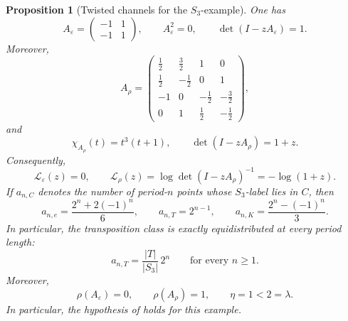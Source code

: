 \documentclass[11pt,a4paper]{amsart}
\theoremstyle{plain}
\newtheorem{proposition}[theorem]{Proposition}
\theoremstyle{definition}
\theoremstyle{remark}
\begin{document}
\begin{proposition}[Twisted channels for the \(S_3\)-example]
  \label{prop:s3-example-channels}
  One has
  \begin{equation}\label{eq:s3-example-aeps}
    A_\varepsilon=
    \begin{pmatrix}
      -1 & 1 \\
      -1 & 1
    \end{pmatrix},
    \qquad
    A_\varepsilon^2=0,
    \qquad
    \det(I-zA_\varepsilon)=1.
  \end{equation}
  Moreover,
  \begin{equation}\label{eq:s3-example-arho}
    A_\rho=
    \begin{pmatrix}
      \frac12 & \frac32 & 1 & 0 \\
      \frac12 & -\frac12 & 0 & 1 \\
      -1 & 0 & -\frac12 & -\frac32 \\
      0 & 1 & \frac12 & -\frac12
    \end{pmatrix},
  \end{equation}
  and
  \begin{equation}\label{eq:s3-example-arho-charpoly}
    \chi_{A_\rho}(t)=t^3(t+1),
    \qquad
    \det(I-zA_\rho)=1+z.
  \end{equation}
  Consequently,
  \begin{equation}\label{eq:s3-example-logarithms}
    \mathcal L_\varepsilon(z)=0,
    \qquad
    \mathcal L_\rho(z)=\log\det(I-zA_\rho)^{-1}=-\log(1+z).
  \end{equation}
  If \(a_{n,C}\) denotes the number of period-\(n\) points whose
  \(S_3\)-label lies in \(C\), then
  \begin{equation}\label{eq:s3-example-periodic-classes}
    a_{n,e}=\frac{2^n+2(-1)^n}{6},
    \qquad
    a_{n,T}=2^{n-1},
    \qquad
    a_{n,K}=\frac{2^n-(-1)^n}{3}.
  \end{equation}
  In particular, the transposition class is exactly equidistributed at
  every period length:
  \begin{equation}\label{eq:s3-example-periodic-equidistribution}
    a_{n,T}=\frac{|T|}{|S_3|}\,2^n
    \qquad \text{for every } n\ge 1.
  \end{equation}
  Moreover,
  \begin{equation}\label{eq:s3-example-eta-check}
    \rho(A_\varepsilon)=0,
    \qquad
    \rho(A_\rho)=1,
    \qquad
    \eta=1<2=\lambda.
  \end{equation}
  In particular, the hypothesis of
   holds for this example.
\end{proposition}
\end{document}
